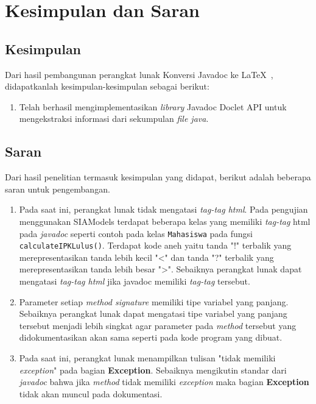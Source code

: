 \chapter{Kesimpulan dan Saran}
\label{sec:kesimpulan dan saran}

\section{Kesimpulan}
\label{sec:kesimpulan}
Dari hasil pembangunan perangkat lunak Konversi Javadoc ke \LaTeX\ , didapatkanlah kesimpulan-kesimpulan sebagai berikut:
\begin{enumerate}
	\item Telah berhasil mengimplementasikan {\it library} Javadoc Doclet API untuk mengekstraksi informasi dari sekumpulan {\it file java}.
\end{enumerate}

\section{Saran}
\label{sec:saran}
Dari hasil penelitian termasuk kesimpulan yang didapat, berikut adalah beberapa saran untuk pengembangan.
\begin{enumerate}
	\item Pada saat ini, perangkat lunak tidak mengatasi {\it tag-tag html}. Pada pengujian menggunakan SIAModels terdapat beberapa kelas yang memiliki {\it tag-tag} html pada {\it javadoc} seperti contoh pada kelas {\tt Mahasiswa} pada fungsi {\tt calculateIPKLulus()}. Terdapat kode aneh yaitu tanda "!" terbalik yang merepresentasikan tanda lebih kecil "<" dan tanda "?" terbalik yang merepresentasikan tanda lebih besar ">". Sebaiknya perangkat lunak dapat mengatasi {\it tag-tag html} jika javadoc memiliki {\it tag-tag} tersebut.
	\item Parameter setiap {\it method signature} memiliki tipe variabel yang panjang. Sebaiknya perangkat lunak dapat mengatasi tipe variabel yang panjang tersebut menjadi lebih singkat agar parameter pada {\it method} tersebut yang didokumentasikan akan sama seperti pada kode program yang dibuat.
	\item Pada saat ini, perangkat lunak menampilkan tulisan "tidak memiliki {\it exception}" pada bagian {\bf Exception}. Sebaiknya mengikutin standar dari {\it javadoc} bahwa jika {\it method} tidak memiliki {\it exception} maka bagian {\bf Exception} tidak akan muncul pada dokumentasi.
\end{enumerate}
